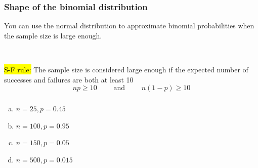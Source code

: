 \documentclass[11pt,containsverbatim,handout,xcolor=xelatex,dvipsnames,table]{beamer}
\newcommand{\solnMult}[1]{#1}
\newcommand{\soln}[1]{}
\begin{document}
\begin{frame}
\frametitle{Shape of the binomial distribution}

\vfill

\begin{center}
\end{center}
\vfill

\pause

You can use the normal distribution to approximate binomial probabilities when
the sample size is large enough.

\hfill \\

\pause

\hl{S-F rule:} 
The sample size is considered large enough if the expected number of successes and failures are both at least 10
\[ np \ge 10 \qquad \text{ and } \qquad n(1-p) \ge 10 \]

\end{frame}


\begin{frame}
\frametitle{}


\begin{enumerate}[(a)]
\item \solnMult{$n = 25, p = 0.45$} \only<2>{\soln{\red{$\rightarrow$ $25 \times 0.45 = 11.25$ and $25 \times 0.55 = 13.75$}}}
\item $n = 100, p = 0.95$ \only<2>{\soln{\darkgray{$\rightarrow$ $100 \times 0.95 = 95$ but $100 \times 0.05 = 5$}}}
\item $n = 150, p = 0.05$ \only<2>{\soln{\darkgray{$\rightarrow$ $150 \times 0.05 = 7.5$}}}
\item $n = 500, p = 0.015$ \only<2>{\soln{\darkgray{$\rightarrow$ $500 \times 0.015 = 7.5$}}}
\end{enumerate}

\end{frame}



\begin{frame}

\vfill


\vfill

\end{frame}
\end{document}
